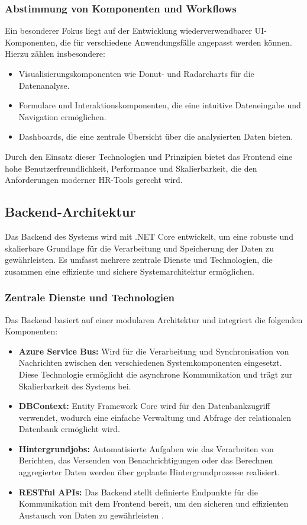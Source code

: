 \subsubsection*{Abstimmung von Komponenten und Workflows} 
Ein besonderer Fokus liegt auf der Entwicklung wiederverwendbarer UI-Komponenten, die für verschiedene Anwendungsfälle angepasst werden können. Hierzu zählen insbesondere: 
\begin{itemize}
    \item Visualisierungskomponenten wie Donut- und Radarcharts für die Datenanalyse.
    \item Formulare und Interaktionskomponenten, die eine intuitive Dateneingabe und Navigation ermöglichen.
    \item Dashboards, die eine zentrale Übersicht über die analysierten Daten bieten.
\end{itemize}

Durch den Einsatz dieser Technologien und Prinzipien bietet das Frontend eine hohe Benutzerfreundlichkeit, Performance und Skalierbarkeit, die den Anforderungen moderner HR-Tools gerecht wird.


\subsection{Backend-Architektur}

Das Backend des Systems wird mit .NET Core entwickelt, um eine robuste und skalierbare Grundlage für die Verarbeitung und Speicherung der Daten zu gewährleisten. Es umfasst mehrere zentrale Dienste und Technologien, die zusammen eine effiziente und sichere Systemarchitektur ermöglichen.\cite{azureArchitecture2024}

\subsubsection*{Zentrale Dienste und Technologien}
Das Backend basiert auf einer modularen Architektur und integriert die folgenden Komponenten:
\begin{itemize}
    \item \textbf{Azure Service Bus:} Wird für die Verarbeitung und Synchronisation von Nachrichten zwischen den verschiedenen Systemkomponenten eingesetzt. Diese Technologie ermöglicht die asynchrone Kommunikation und trägt zur Skalierbarkeit des Systems bei.\cite{azureServiceBus2024}
    \item \textbf{DBContext:} Entity Framework Core wird für den Datenbankzugriff verwendet, wodurch eine einfache Verwaltung und Abfrage der relationalen Datenbank ermöglicht wird.\cite{entityFrameworkCore2020}
    \item \textbf{Hintergrundjobs:} Automatisierte Aufgaben wie das Verarbeiten von Berichten, das Versenden von Benachrichtigungen oder das Berechnen aggregierter Daten werden über geplante Hintergrundprozesse realisiert.\cite{backgroundTasks2017}
    \item \textbf{RESTful APIs:} Das Backend stellt definierte Endpunkte für die Kommunikation mit dem Frontend bereit, um den sicheren und effizienten Austausch von Daten zu gewährleisten \cite{microsoftDotNet}.
\end{itemize}

